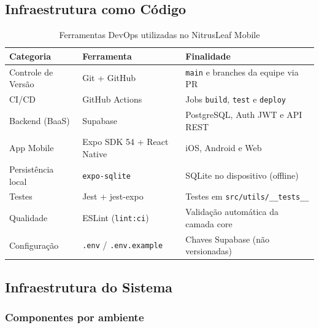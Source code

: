 \subsection{Infraestrutura como Código}

\begin{table}[H]
\centering
\caption{Ferramentas DevOps utilizadas no NitrusLeaf Mobile}
\label{tab:devops-tools}
\begin{tabular}{|l|l|p{6cm}|}
\hline
\textbf{Categoria} & \textbf{Ferramenta} & \textbf{Finalidade} \\
\hline
Controle de Versão & Git + GitHub & \texttt{main} e branches da equipe via PR \\
CI/CD & GitHub Actions & Jobs \texttt{build}, \texttt{test} e \texttt{deploy} \\
Backend (BaaS) & Supabase & PostgreSQL, Auth JWT e API REST \\
App Mobile & Expo SDK 54 + React Native & iOS, Android e Web \\
Persistência local & \texttt{expo-sqlite} & SQLite no dispositivo (offline) \\
Testes & Jest + jest-expo & Testes em \texttt{src/utils/\_\_tests\_\_} \\
Qualidade & ESLint (\texttt{lint:ci}) & Validação automática da camada core \\
Configuração & \texttt{.env} / \texttt{.env.example} & Chaves Supabase (não versionadas) \\
\hline
\end{tabular}
\end{table}

\subsection{Infraestrutura do Sistema}

\subsubsection{Componentes por ambiente}

